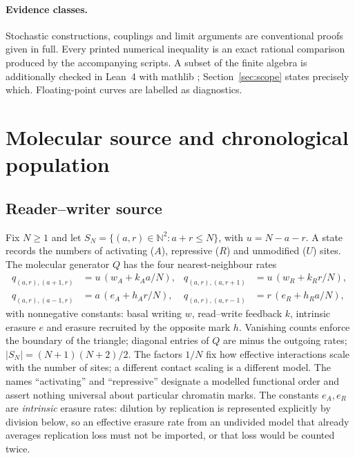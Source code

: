 \documentclass[11pt]{article}
\theoremstyle{remark}
\newcommand{\N}{\mathbb N}
\begin{document}
\paragraph{Evidence classes.}
Stochastic constructions, couplings and limit arguments are conventional
proofs given in full. Every printed numerical inequality is an exact
rational comparison produced by the accompanying scripts. A subset of the
finite algebra is additionally checked in Lean~4 with mathlib
\cite{moura2021,mathlib2020}; Section~\ref{sec:scope} states precisely which.
Floating-point curves are labelled as diagnostics.

\section{Molecular source and chronological population}\label{sec:source}

\subsection{Reader--writer source}
Fix $N\ge1$ and let $S_N=\{(a,r)\in\N^2:a+r\le N\}$, with $u=N-a-r$.
A state records the numbers of activating ($A$), repressive ($R$) and
unmodified ($U$) sites. The molecular generator $Q$ has the four
nearest-neighbour rates
\begin{align}
 q_{(a,r),(a+1,r)}&=u\,(w_A+k_Aa/N),&q_{(a,r),(a,r+1)}&=u\,(w_R+k_Rr/N),\label{eq:write}\\
 q_{(a,r),(a-1,r)}&=a\,(e_A+h_Ar/N),&q_{(a,r),(a,r-1)}&=r\,(e_R+h_Ra/N),\label{eq:erase}
\end{align}
with nonnegative constants: basal writing $w$, read--write feedback $k$,
intrinsic erasure $e$ and erasure recruited by the opposite mark $h$. Vanishing
counts enforce the boundary of the triangle; diagonal entries of $Q$ are minus
the outgoing rates; $|S_N|=(N+1)(N+2)/2$. The factors $1/N$ fix how effective
interactions scale with the number of sites; a different contact scaling is a
different model. The names ``activating'' and ``repressive'' designate a
modelled functional order and assert nothing universal about particular
chromatin marks. The constants $e_A,e_R$ are \emph{intrinsic} erasure rates:
dilution by replication is represented explicitly by division below, so an
effective erasure rate from an undivided model that already averages
replication loss \cite{bruno2022} must not be imported, or that loss would be
counted twice.
\end{document}
